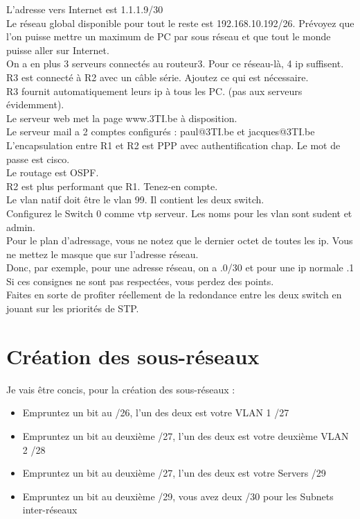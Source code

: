 \documentclass[a4paper,10pt,final,fleqn]{article}
\begin{document}
	L'adresse vers Internet est 1.1.1.9/30\\
	Le réseau global disponible pour tout le reste est 192.168.10.192/26. Prévoyez que l'on puisse mettre un maximum de PC par sous réseau et que tout le monde puisse aller sur Internet.\\

	On a en plus 3 serveurs connectés au routeur3. Pour ce réseau-là, 4 ip suffisent.\\
	R3 est connecté à R2 avec un câble série. Ajoutez ce qui est nécessaire.\\
	R3 fournit automatiquement leurs ip à tous les PC. (pas aux serveurs évidemment).\\
	Le serveur web met la page www.3TI.be à disposition.\\
	Le serveur mail a 2 comptes configurés : paul@3TI.be et jacques@3TI.be\\

	L'encapsulation entre R1 et R2 est PPP avec authentification chap. Le mot de passe est cisco.\\

	Le routage est OSPF.\\

	R2 est plus performant que R1. Tenez-en compte.\\

	Le vlan natif doit être le vlan 99. Il contient les deux switch.\\

	Configurez le Switch 0 comme vtp serveur. Les noms pour les vlan sont sudent et admin.\\
	Pour le plan d’adressage, vous ne notez que le dernier octet de toutes les ip. Vous ne mettez le masque que sur l’adresse réseau.\\
	Donc, par exemple, pour une adresse réseau, on a .0/30 et pour une ip normale .1\\
	Si ces consignes ne sont pas respectées, vous perdez des points.\\

	Faites en sorte de profiter réellement de la redondance entre les deux switch en jouant sur les priorités de STP.\\


\section{Création des sous-réseaux}

	Je vais être concis, pour la création des sous-réseaux : \\
	\begin{itemize}
		\item Empruntez un bit au /26, l'un des deux est votre VLAN 1 /27	
		\item Empruntez un bit au deuxième /27, l'un des deux est votre deuxième VLAN 2 /28
		\item Empruntez un bit au deuxième /27, l'un des deux est votre Servers /29
		\item Empruntez un bit au deuxième /29, vous avez deux /30 pour les Subnets inter-réseaux\\
	\end{itemize}
\end{document}
